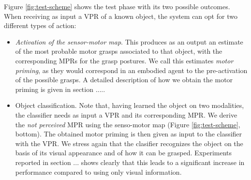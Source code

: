 Figure \ref{fig:test-scheme} shows the test phase with its two possible outcomes. When receiving as input a VPR of a known object, the system can
opt for two different types of action:
\begin{itemize}
\item {\em Activation of the sensor-motor map}. This produces as an output an estimate of the most probable motor grasps associated 
to that object, with the corresponding 
MPRs for the grasp postures. We call this estimates {\em motor priming}, as they would correspond in an embodied agent to the pre-activation of the possible 
grasps. A detailed description of how we obtain the motor priming is given in section .....

\item {Object classification}. Note that, having learned the object on two modalities, the classifier needs as input a VPR and its corresponding MPR. We derive the
{\em not perceived} MPR using the senso-motor map (Figure \ref{fig:test-scheme}, bottom). The obtained motor priming is then given as input to the classifier with the VPR. We stress again that the clasifier recognizes the object on the basis of its visual appearance and of how it can be grasped. Experiments
reported in section ... shows clearly that this leads to a significant increase in performance compared to using only visual information.

\end{itemize}

